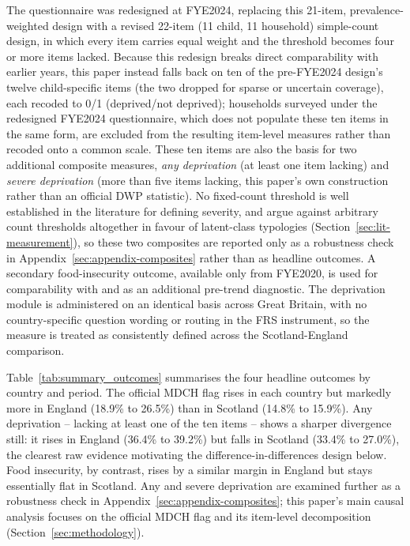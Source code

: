 The questionnaire was redesigned at FYE2024, replacing this 21-item, prevalence-weighted design with a revised 22-item (11 child, 11 household) simple-count design, in which every item carries equal weight and the threshold becomes four or more items lacked. Because this redesign breaks direct comparability with earlier years, this paper instead falls back on ten of the pre-FYE2024 design's twelve child-specific items (the two dropped for sparse or uncertain coverage), each recoded to 0/1 (deprived/not deprived); households surveyed under the redesigned FYE2024 questionnaire, which does not populate these ten items in the same form, are excluded from the resulting item-level measures rather than recoded onto a common scale. These ten items are also the basis for two additional composite measures, \emph{any deprivation} (at least one item lacking) and \emph{severe deprivation} (more than five items lacking, this paper's own construction rather than an official DWP statistic). No fixed-count threshold is well established in the literature for defining severity, and \citet{nicoriciuelliot2025} argue against arbitrary count thresholds altogether in favour of latent-class typologies (Section~\ref{sec:lit-measurement}), so these two composites are reported only as a robustness check in Appendix~\ref{sec:appendix-composites} rather than as headline outcomes. A secondary food-insecurity outcome, available only from FYE2020, is used for comparability with \citet{andersen2025} and as an additional pre-trend diagnostic. The deprivation module is administered on an identical basis across Great Britain, with no country-specific question wording or routing in the FRS instrument, so the measure is treated as consistently defined across the Scotland-England comparison.

Table~\ref{tab:summary_outcomes} summarises the four headline outcomes by country and period. The official MDCH flag rises in each country but markedly more in England (18.9\% to 26.5\%) than in Scotland (14.8\% to 15.9\%). Any deprivation -- lacking at least one of the ten items -- shows a sharper divergence still: it rises in England (36.4\% to 39.2\%) but falls in Scotland (33.4\% to 27.0\%), the clearest raw evidence motivating the difference-in-differences design below. Food insecurity, by contrast, rises by a similar margin in England but stays essentially flat in Scotland. Any and severe deprivation are examined further as a robustness check in Appendix~\ref{sec:appendix-composites}; this paper's main causal analysis focuses on the official MDCH flag and its item-level decomposition (Section~\ref{sec:methodology}).

